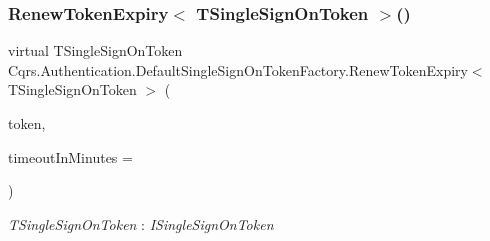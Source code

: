 \subsubsection{\texorpdfstring{Renew\+Token\+Expiry$<$ T\+Single\+Sign\+On\+Token $>$()}{RenewTokenExpiry< TSingleSignOnToken >()}}
{\footnotesize\ttfamily virtual T\+Single\+Sign\+On\+Token Cqrs.\+Authentication.\+Default\+Single\+Sign\+On\+Token\+Factory.\+Renew\+Token\+Expiry$<$ T\+Single\+Sign\+On\+Token $>$ (\begin{DoxyParamCaption}\item[{T\+Single\+Sign\+On\+Token}]{token,  }\item[{int}]{timeout\+In\+Minutes = {} }\end{DoxyParamCaption})\hspace{0.3cm}{\ttfamily [virtual]}}

\begin{Desc}
\item[Type Constraints]\begin{description}
\item[{\em T\+Single\+Sign\+On\+Token} : {\em I\+Single\+Sign\+On\+Token}]\end{description}
\end{Desc}
